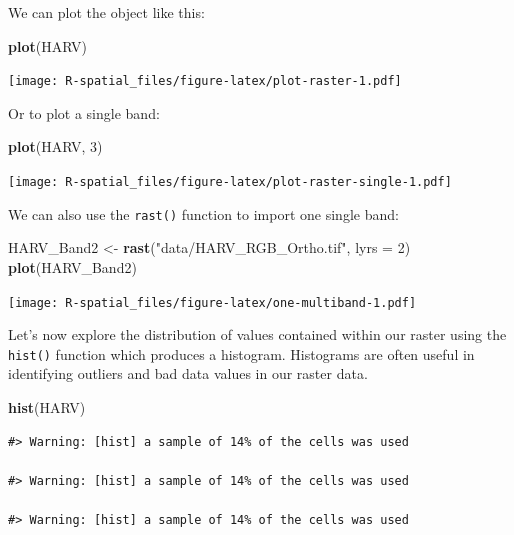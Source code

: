 \documentclass[
]{book}
\newenvironment{Shaded}{\begin{snugshade}}{\end{snugshade}}
\newcommand{\AttributeTok}[1]{\textcolor[rgb]{0.13,0.29,0.53}{#1}}
\newcommand{\DecValTok}[1]{\textcolor[rgb]{0.00,0.00,0.81}{#1}}
\newcommand{\FunctionTok}[1]{\textcolor[rgb]{0.13,0.29,0.53}{\textbf{#1}}}
\newcommand{\NormalTok}[1]{#1}
\newcommand{\OtherTok}[1]{\textcolor[rgb]{0.56,0.35,0.01}{#1}}
\newcommand{\StringTok}[1]{\textcolor[rgb]{0.31,0.60,0.02}{#1}}
\begin{document}
We can plot the object like this:

\begin{Shaded}
\begin{Highlighting}[]
\FunctionTok{plot}\NormalTok{(HARV)}
\end{Highlighting}
\end{Shaded}

\texttt{[image: R-spatial\_files/figure-latex/plot-raster-1.pdf]}

Or to plot a single band:

\begin{Shaded}
\begin{Highlighting}[]
\FunctionTok{plot}\NormalTok{(HARV, }\DecValTok{3}\NormalTok{)}
\end{Highlighting}
\end{Shaded}

\texttt{[image: R-spatial\_files/figure-latex/plot-raster-single-1.pdf]}

We can also use the \texttt{rast()} function to import one single band:

\begin{Shaded}
\begin{Highlighting}[]
\NormalTok{HARV\_Band2 }\OtherTok{\textless{}{-}} \FunctionTok{rast}\NormalTok{(}\StringTok{"data/HARV\_RGB\_Ortho.tif"}\NormalTok{, }\AttributeTok{lyrs =} \DecValTok{2}\NormalTok{)}
\FunctionTok{plot}\NormalTok{(HARV\_Band2)}
\end{Highlighting}
\end{Shaded}

\texttt{[image: R-spatial\_files/figure-latex/one-multiband-1.pdf]}

Let's now explore the distribution of values contained within our raster using the \texttt{hist()} function which produces a histogram. Histograms are often useful in identifying outliers and bad data values in our raster data.

\begin{Shaded}
\begin{Highlighting}[]
\FunctionTok{hist}\NormalTok{(HARV)}
\end{Highlighting}
\end{Shaded}

\begin{verbatim}
#> Warning: [hist] a sample of 14% of the cells was used

#> Warning: [hist] a sample of 14% of the cells was used

#> Warning: [hist] a sample of 14% of the cells was used
\end{verbatim}
\end{document}
